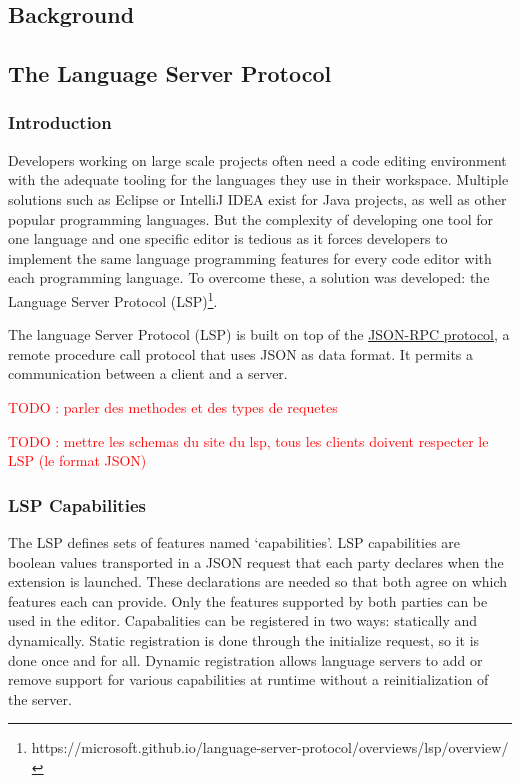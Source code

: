 \documentclass[10pt]{article}
\begin{document}
\begin{singlespace}
\section{Background}
\subsection{The Language Server Protocol}
\subsubsection{Introduction}
Developers working on large scale projects often need a code editing environment with the adequate tooling for the languages they use in their workspace. Multiple solutions such as Eclipse or IntelliJ IDEA exist for Java projects, as well as other popular programming languages. But the complexity of developing one tool for one language and one specific editor is tedious as it forces developers to implement the same language programming features for every code editor with each programming language. To overcome these, a solution was developed: the Language Server Protocol (LSP)\footnote{https://microsoft.github.io/language-server-protocol/overviews/lsp/overview/}.

The language Server Protocol (LSP) is built on top of the \href{https://www.jsonrpc.org/specification}{JSON-RPC protocol}, a remote procedure call protocol that uses JSON as data format.
It permits a communication between a client and a server.

\textcolor{red}{TODO : parler des methodes et des types de requetes}

\textcolor{red}{TODO :  mettre les schemas du site du lsp, tous les clients doivent respecter le LSP (le format JSON)}


\subsubsection{LSP Capabilities}
The LSP defines sets of features named `capabilities'. LSP capabilities are boolean values transported in a JSON request that each party declares when the extension is launched.
These declarations are needed so that both agree on which features each can provide. Only the features supported by both parties can be used in the editor. 
\color{magenta}
Capabalities can be registered in two ways: statically and dynamically.
Static registration is done through the initialize request, so it is done once and for all.
Dynamic registration allows language servers to add or remove support for various capabilities at runtime without a reinitialization of the server. 


\end{singlespace}
\end{document}
